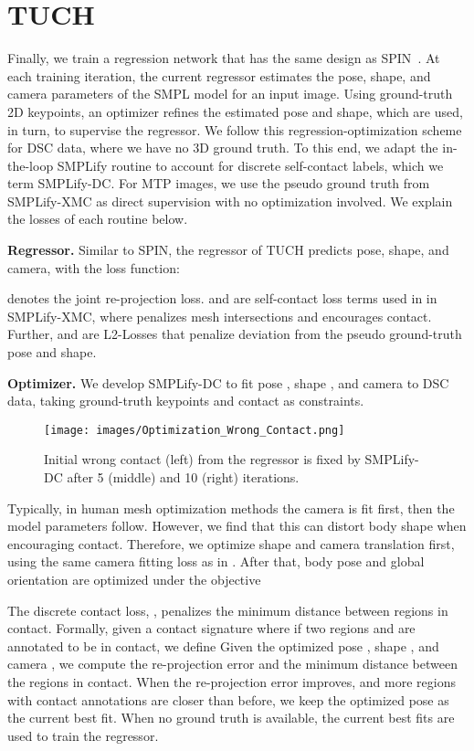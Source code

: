 \documentclass[final]{cvpr}
\newcommand{\mtp}{\mbox{MTP}\xspace}
\newcommand{\dsc}{\mbox{DSC}\xspace}
\newcommand{\smplifyxmc}{\mbox{SMPLify-XMC}\xspace}
\newcommand{\smplifyxdc}{\mbox{SMPLify-DC}\xspace}
\theoremstyle{definition}
\begin{document}
 	\section{TUCH}
\label{sec:tuch}
Finally, we train a regression network that has the same design as SPIN~\cite{kolotouros2019learning}. At each training iteration, the current regressor estimates the pose, shape, and camera parameters of the SMPL model for an input image. 
Using ground-truth 2D keypoints, an optimizer refines the estimated pose and shape, which are used, in turn, to supervise the  regressor.
We follow this regression-optimization scheme for \dsc data, where we have no 3D ground truth. 
To this end, we adapt the in-the-loop SMPLify routine to account for discrete self-contact labels, which we term \smplifyxdc.
For \mtp images, we use the pseudo ground truth from \smplifyxmc as direct supervision with no optimization involved.
We explain the losses of each routine below.

\textbf{Regressor.} Similar to SPIN, the regressor of TUCH predicts pose, shape, and camera, with the loss function:

 denotes the joint re-projection loss.  and  are self-contact loss terms used in  in \smplifyxmc, where  penalizes mesh intersections and  encourages contact. Further,  and  are L2-Losses that penalize deviation from the pseudo ground-truth pose and shape.

\textbf{Optimizer.} We develop \smplifyxdc to fit pose , shape , and camera  to DSC data, taking ground-truth keypoints and contact as constraints.
\begin{figure}[t]
	\centerline{\texttt{[image: images/Optimization\_Wrong\_Contact.png]}}
	\caption{Initial wrong contact (left) from the regressor is fixed by \smplifyxdc after 5 (middle) and 10 (right) iterations.}
	\label{fig:Optimization_Wrong_Contact}
\end{figure}
Typically, in human mesh optimization methods the camera is fit first, then the model parameters follow. However, we find that this can distort  body shape when encouraging contact. Therefore, we optimize shape and camera translation first, using the same camera fitting loss as in \cite{kolotouros2019learning}. After that, body pose and global orientation are optimized under the objective 

The discrete contact loss, , penalizes the minimum distance between regions in contact. 
Formally, given a contact signature  where  if two regions  and  are annotated to be in contact, we define  
Given the optimized pose , shape , and camera , we compute the re-projection error and the minimum distance between the regions in contact.
When the re-projection error improves, and more regions with contact annotations are closer than before, we keep the optimized pose as the current best fit. 
When no ground truth is available, the current best fits are used to train the regressor. 
\end{document}
